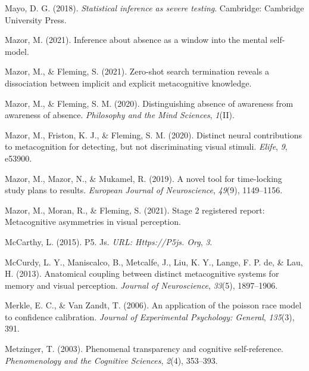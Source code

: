 \documentclass[12pt,twoside]{reedthesis}
\begin{document}
\leavevmode\hypertarget{ref-mayo2018statistical}{}%
Mayo, D. G. (2018). \emph{Statistical inference as severe testing}. Cambridge: Cambridge University Press.

\leavevmode\hypertarget{ref-mazor2021inference}{}%
Mazor, M. (2021). Inference about absence as a window into the mental self-model.

\leavevmode\hypertarget{ref-mazor2021zero}{}%
Mazor, M., \& Fleming, S. (2021). Zero-shot search termination reveals a dissociation between implicit and explicit metacognitive knowledge.

\leavevmode\hypertarget{ref-mazor2020distinguishing}{}%
Mazor, M., \& Fleming, S. M. (2020). Distinguishing absence of awareness from awareness of absence. \emph{Philosophy and the Mind Sciences}, \emph{1}(II).

\leavevmode\hypertarget{ref-mazor2020distinct}{}%
Mazor, M., Friston, K. J., \& Fleming, S. M. (2020). Distinct neural contributions to metacognition for detecting, but not discriminating visual stimuli. \emph{Elife}, \emph{9}, e53900.

\leavevmode\hypertarget{ref-mazor2019novel}{}%
Mazor, M., Mazor, N., \& Mukamel, R. (2019). A novel tool for time-locking study plans to results. \emph{European Journal of Neuroscience}, \emph{49}(9), 1149--1156.

\leavevmode\hypertarget{ref-mazor2021stage}{}%
Mazor, M., Moran, R., \& Fleming, S. (2021). Stage 2 registered report: Metacognitive asymmetries in visual perception.

\leavevmode\hypertarget{ref-mccarthy2015p5}{}%
McCarthy, L. (2015). P5. Js. \emph{URL: Https://P5js. Org}, \emph{3}.

\leavevmode\hypertarget{ref-mccurdy2013anatomical}{}%
McCurdy, L. Y., Maniscalco, B., Metcalfe, J., Liu, K. Y., Lange, F. P. de, \& Lau, H. (2013). Anatomical coupling between distinct metacognitive systems for memory and visual perception. \emph{Journal of Neuroscience}, \emph{33}(5), 1897--1906.

\leavevmode\hypertarget{ref-merkle2006application}{}%
Merkle, E. C., \& Van Zandt, T. (2006). An application of the poisson race model to confidence calibration. \emph{Journal of Experimental Psychology: General}, \emph{135}(3), 391.

\leavevmode\hypertarget{ref-metzinger2003phenomenal}{}%
Metzinger, T. (2003). Phenomenal transparency and cognitive self-reference. \emph{Phenomenology and the Cognitive Sciences}, \emph{2}(4), 353--393.
\end{document}
